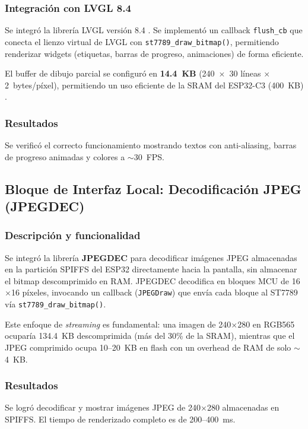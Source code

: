 \documentclass[letterpaper,11pt]{article}
\begin{document}
\subsubsection{Integración con LVGL 8.4}
Se integró la librería LVGL versión 8.4 \citep{lvgl_ref}. Se implementó un callback \texttt{flush\_cb} que conecta el lienzo virtual de LVGL con \texttt{st7789\_draw\_bitmap()}, permitiendo renderizar widgets (etiquetas, barras de progreso, animaciones) de forma eficiente.

El buffer de dibujo parcial se configuró en \textbf{14.4~KB} (240~$\times$~30 líneas $\times$ 2~bytes/píxel), permitiendo un uso eficiente de la SRAM del ESP32-C3 (400~KB) \citep{esp32c3_ds}.

\subsubsection{Resultados}
Se verificó el correcto funcionamiento mostrando textos con anti-aliasing, barras de progreso animadas y colores a $\sim$30~FPS.

\subsection{Bloque de Interfaz Local: Decodificación JPEG (JPEGDEC)}

\subsubsection{Descripción y funcionalidad}
Se integró la librería \textbf{JPEGDEC} \citep{jpegdec_ref} para decodificar imágenes JPEG almacenadas en la partición SPIFFS \citep{espspiffs_ref} del ESP32 directamente hacia la pantalla, sin almacenar el bitmap descomprimido en RAM. JPEGDEC decodifica en bloques MCU de 16$\times$16 píxeles, invocando un callback (\texttt{JPEGDraw}) que envía cada bloque al ST7789 vía \texttt{st7789\_draw\_bitmap()}.

Este enfoque de \textit{streaming} es fundamental: una imagen de 240$\times$280 en RGB565 ocuparía 134.4~KB descomprimida (más del 30\% de la SRAM), mientras que el JPEG comprimido ocupa 10--20~KB en flash con un overhead de RAM de solo $\sim$4~KB.

\subsubsection{Resultados}
Se logró decodificar y mostrar imágenes JPEG de 240$\times$280 almacenadas en SPIFFS. El tiempo de renderizado completo es de 200--400~ms.
\end{document}
